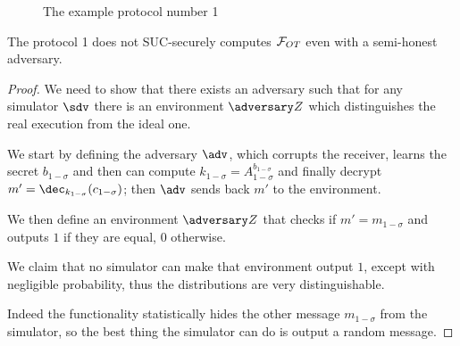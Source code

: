 \begin{figure}
    \caption{The example protocol number 1}
    \label{prot_dummy_1}
\end{figure}

\begin{proposition}
    The protocol 1 does not SUC-securely computes $\mathcal{F}_{OT}$ even with a semi-honest adversary.
\end{proposition}

\begin{proof}
    We need to show that there exists an adversary such that for any simulator $\sdv$ there is an environment $\zdv$ which distinguishes the real execution from the ideal one.

    We start by defining the adversary $\adv$, which corrupts the receiver, learns the secret $b_{1-\sigma}$ and then can compute $k_{1-\sigma} = A_{1-\sigma}^{b_{1-\sigma}}$ and finally decrypt $m'=\dec_{k_{1-\sigma}}(c_{1-\sigma})$; then $\adv$ sends back $m'$ to the environment.

    We then define an environment $\zdv$ that checks if $m'=m_{1-\sigma}$ and outputs $1$ if they are equal, $0$ otherwise.

    We claim that no simulator can make that environment output $1$, except with negligible probability, thus the distributions are very distinguishable.

    Indeed the functionality statistically hides the other message $m_{1-\sigma}$ from the simulator, so the best thing the simulator can do is output a random message. 
\end{proof}

